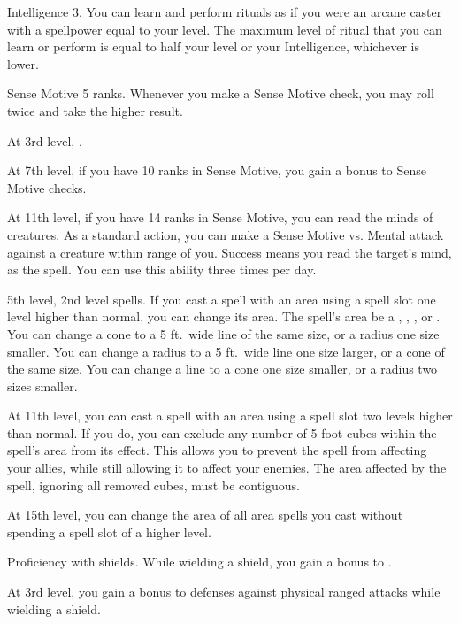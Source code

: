     \featpre Intelligence 3.
    \featben You can learn and perform rituals as if you were an arcane caster with a spellpower equal to your level.
    The maximum level of ritual that you can learn or perform is equal to half your level or your Intelligence, whichever is lower.

    \featpre Sense Motive 5 ranks.
    \featben Whenever you make a Sense Motive check, you may roll twice and take the higher result.

    At 3rd level, \tdash.

    At 7th level, if you have 10 ranks in Sense Motive, you gain a  bonus to Sense Motive checks.

    At 11th level, if you have 14 ranks in Sense Motive, you can read the minds of creatures.
    As a standard action, you can make a Sense Motive vs. Mental attack against a creature within \rngmed range of you.
    Success means you read the target's mind, as the  spell.
    You can use this ability three times per day.

    \featpre 5th level, 2nd level spells.
    \featben If you cast a spell with an area using a spell slot one level higher than normal, you can change its area.
    The spell's area be a \areasmall, \areamed, \arealarge, or \areahuge {}.
    You can change a cone to a 5 ft.\ wide line of the same size, or a radius one size smaller.
    You can change a radius to a 5 ft.\ wide line one size larger, or a cone of the same size.
    You can change a line to a cone one size smaller, or a radius two sizes smaller.

    At 11th level, you can cast a spell with an area using a spell slot two levels higher than normal.
    If you do, you can exclude any number of 5-foot cubes within the spell's area from its effect.
    This allows you to prevent the spell from affecting your allies, while still allowing it to affect your enemies.
    The area affected by the spell, ignoring all removed cubes, must be contiguous.

    At 15th level, you can change the area of all area spells you cast without spending a spell slot of a higher level.

    \featpre Proficiency with shields.
    \featben While wielding a shield, you gain a  bonus to .

    At 3rd level, you gain a  bonus to defenses against physical ranged attacks while wielding a shield.

